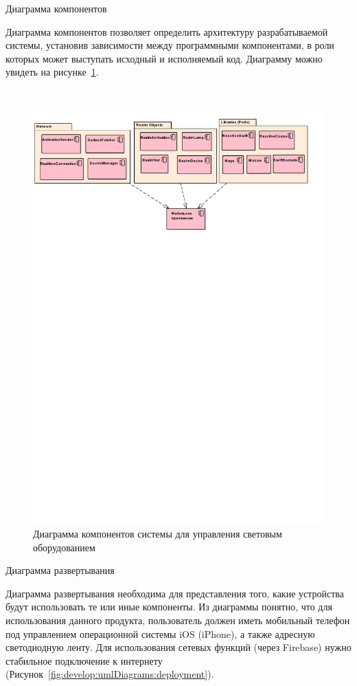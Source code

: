Диаграмма компонентов

Диаграмма компонентов позволяет определить архитектуру разрабатываемой системы, установив зависимости между программными компонентами, в роли которых может выступать исходный  и исполняемый код. Диаграмму можно увидеть на рисунке~\ref{fig:develop:umlDiagrams:component}.

~
\begin{figure}[H]
\centering
	\includegraphics[scale=0.8]{figures/diagrams/uml_component.pdf}
	\caption{Диаграмма компонентов системы для управления световым оборудованием}
	\label{fig:develop:umlDiagrams:component}
\end{figure}

Диаграмма развертывания

Диаграмма развертывания необходима для представления того, какие устройства будут использовать те или иные компоненты. Из диаграммы понятно, что для использования данного продукта, пользователь должен иметь мобильный телефон под управлением операционной системы iOS (iPhone), а также адресную светодиодную ленту. Для использования сетевых функций (через Firebase) нужно стабильное подключение к интернету (Рисунок~\ref{fig:develop:umlDiagrams:deployment}).

